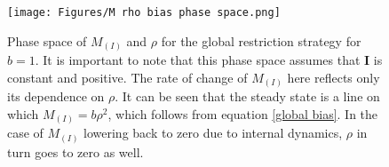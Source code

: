 \begin{figure}
    \centering
    \texttt{[image: Figures/M rho bias phase space.png]}
    \caption{\small Phase space of $M_{(I)}$ and $\rho$ for the global restriction strategy for $b=1$. It is important to note that this phase space assumes that $\mathbf{I}$ is constant and positive. The rate of change of $M_{(I)}$ here reflects only its dependence on $\rho$. It can be seen that the steady state is a line on which $M_{(I)}=b \rho^2$, which follows from equation \eqref{global bias}. In the case of $M_{(I)}$ lowering back to zero due to internal dynamics, $\rho$ in turn goes to zero as well.}
\end{figure}




% 